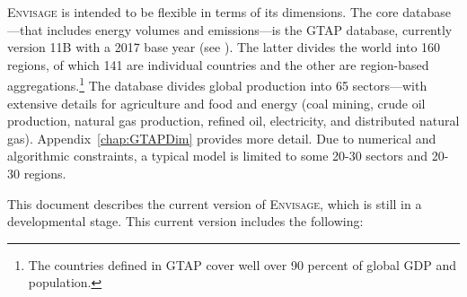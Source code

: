 \documentclass[11pt,letterpaper]{report}
\begin{document}
\textsc{Envisage} is intended to be flexible in terms of its dimensions. The
core database---that includes energy volumes and \COT{} emissions---is the GTAP
database, currently version 11B with a 2017 base year (see
\cite{AguiaretalJGEA2023}). The latter divides the world into 160
regions, of which 141 are individual countries and the other are region-based
aggregations.\footnote{The countries defined in GTAP cover well over 90 percent
of global GDP and population.} The database divides global production into 65
sectors---with extensive details for agriculture and food and energy (coal
mining, crude oil production, natural gas production, refined oil, electricity,
and distributed natural gas). Appendix~\ref{chap:GTAPDim} provides more detail.
Due to numerical and algorithmic constraints, a typical model is limited to some
20-30 sectors and 20-30 regions.

This document describes the current version of \textsc{Envisage}, which is still
in a developmental stage. This current version includes the following:
\end{document}
